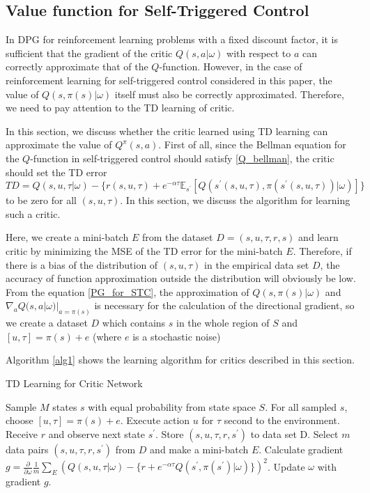 \documentclass[english, dvipdfmx]{ampmt}             %
\newcommand{\expect}{\mathbb{E}}
\newcommand{\pdif}[2]{\frac{\partial#1}{\partial#2}}
\begin{document}
\subsection{Value function for Self-Triggered Control}
In DPG for reinforcement learning problems with a fixed discount factor, it is sufficient that the gradient of the critic $Q(s,a|\omega)$ with respect to $a$ can correctly approximate that of the $Q$-function. However, in the case of reinforcement learning for self-triggered control considered in this paper, the value of $Q(s,\pi(s)|\omega)$ itself must also be correctly approximated. Therefore, we need to pay attention to the TD learning of critic.\par
In this section, we discuss whether the critic learned using TD learning can approximate the value of $Q^{\pi}(s,a)$. First of all, since the Bellman equation for the $Q$-function in self-triggered control should satisfy \eqref{Q_bellman}, the critic should set the TD error
\begin{equation}
	TD = Q(s,u,\tau|\omega) - \{r(s,u,\tau) + e^{-\alpha\tau}\expect_{s^{\prime}}[Q(s^{\prime}(s,u,\tau), \pi(s^{\prime}(s,u,\tau))|\omega)]\}
\end{equation}
 to be zero for all $(s,u,\tau)$. In this section, we discuss the algorithm for learning such a critic.\par
Here, we create a mini-batch $E$ from the dataset $D={(s,u,\tau,r,s)}$ and learn critic by minimizing the MSE of the TD error for the mini-batch $E$. Therefore, if there is a bias of the distribution of $(s,u,\tau)$ in the empirical data set $D$, the accuracy of function approximation outside the distribution will obviously be low. From the equation \eqref{PG_for_STC}, the approximation of $Q(s, \pi(s)|\omega)$ and $\nabla_aQ(s,a|\omega)|_{a=\pi(s)}$ is necessary for the calculation of the directional gradient, so we create a dataset $D$ which contains $s$ in the whole region of $S$ and $[u,\tau] = \pi(s) + e $ (where $e$ is a stochastic noise)\par
Algorithm \ref{alg1} shows the learning algorithm for critics described in this section.
\begin{algorithm}                      
\caption{TD Learning for Critic Network}         
\label{alg1}                          
\begin{algorithmic}                  
    \STATE Sample $M$ states $s$ with equal probability from state space $S$.
    	\STATE For all sampled $s$, choose $[u, \tau]=\pi(s) + e$.
	\STATE Execute action $u$ for $\tau$ second to the environment.
	\STATE Receive $r$ and observe next state $s^{\prime}$.
	\STATE Store $(s, u, \tau, r, s^{\prime})$ to data set D.
    \ENDFOR
    	\STATE Select $m$ data pairs $(s, u, \tau, r, s^{\prime})$ from $D$ and make a mini-batch $E$.
	\STATE Calculate gradient $g = \pdif{}{\omega} \frac{1}{m}\sum_{E}\left(Q(s,u,\tau|\omega) - \{r + e^{-\alpha\tau}Q(s^{\prime}, \pi(s^{\prime})|\omega)\}\right)^2$.
	\STATE Update $\omega$ with gradient $g$.
    \ENDFOR
    \end{algorithmic}
\end{algorithm}\\
\end{document}
